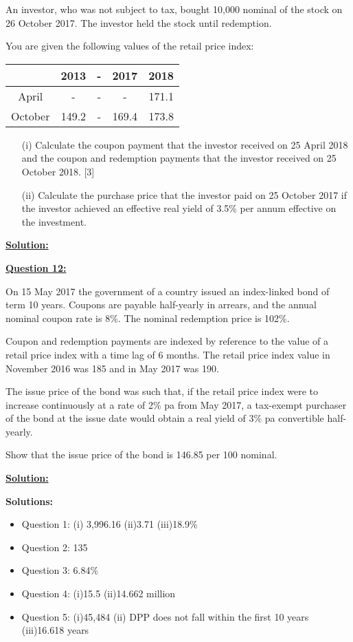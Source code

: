 \documentclass[11pt, answers]{exam}
\begin{document}
An investor, who was not subject to tax, bought 10,000 nominal of the stock on 26 October 2017. The investor held the stock until redemption.

You are given the following values of the retail price index:
\begin{table}[h]
\centering
\begin{tabular}{|c|c|c|c|c|}
	\hline
& 2013 & - & 2017 &2018\\
\hline
April & -&-&-&171.1\\
October & 149.2&-&169.4&173.8\\
\hline
\end{tabular}
\end{table}
\begin{itemize}
\item[(i)] Calculate the coupon payment that the investor received on 25 April 2018 and the coupon and redemption payments that the investor received on 25 October 2018. [3]
\item[(ii)] Calculate the purchase price that the investor paid on 25 October 2017 if the investor achieved an effective real yield of 3.5\% per annum effective on the investment.
\end{itemize}
\bigskip

\underline{\textbf{Solution:}}\bigskip


\underline{\textbf{Question 12:}}\bigskip

On 15 May 2017 the government of a country issued an index-linked bond of term 10 years.
Coupons are payable half-yearly in arrears, and the annual nominal coupon rate is 8\%. The nominal redemption price is 102\%.
\medskip

Coupon and redemption payments are indexed by reference to the value of a retail price index with a time lag of 6 months. The retail price index value in November 2016 was 185 and in May 2017 was 190.

\medskip
The issue price of the bond was such that, if the retail price index were to increase continuously at a rate of 2\% pa from May 2017, a tax-exempt purchaser of the bond at the issue date would obtain a real yield of 3\% pa convertible half-yearly.

\medskip
Show that the issue price of the bond is 146.85 per 100 nominal.

\bigskip

\underline{\textbf{Solution:}}\bigskip	


\newpage

{\Large \textbf{Solutions:}}
\begin{itemize}
	\item Question 1: (i) 3,996.16 (ii)3.71 (iii)18.9\%
	\item Question 2: 135
	\item Question 3: 6.84\%
	\item Question 4: (i)15.5 (ii)14.662 million
	\item Question 5: (i)45,484 (ii) DPP does not fall within the first 10 years (iii)16.618 years
\end{itemize}
\end{document}

